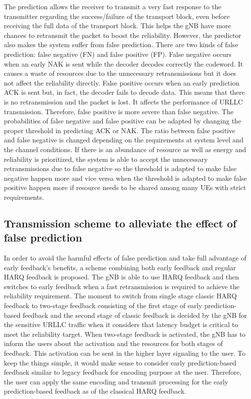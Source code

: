 \documentclass[conference]{IEEEtran}
\begin{document}
The prediction allows the receiver to transmit a very fast response to the transmitter regarding the success/failure of the transport block, even before receiving the full data of the transport block. This helps the gNB have more chances to retransmit the packet to boost the reliability. However, the predictor also makes the system suffer from false prediction. There are two kinds of false prediction: false negative (FN) and false positive (FP). False negative occurs when an early NAK is sent while the decoder decodes correctly the codeword. It causes a waste of resources due to the unnecessary retransmissions but it does not affect the reliability directly. False positive occurs when an early prediction ACK is sent but, in fact, the decoder fails to decode data. This means that there is no retransmission and the packet is lost. It affects the performance of URLLC transmission. Therefore, false positive is more severe than false negative. The probabilities of false negative and false positive can be adapted by changing the proper threshold in predicting ACK or NAK. The ratio between false positive and false negative is changed depending on the requirements at system level and the channel conditions.  If there is an abundance of resource as well as energy and reliability is prioritized, the system is able to accept the unnecessary retransmissions due to false negative so the threshold is adapted to make false negative happen more and vice versa when the threshold is adapted to make false positive happen more if resource needs to be shared among many UEs with strict requirements.

\subsection{Transmission scheme to alleviate the effect of false prediction}\label{CC}

In order to avoid the harmful effects of false prediction and take full advantage of early feedback's benefits, a scheme combining both early feedback and regular HARQ feedback is proposed. The gNB is able to use HARQ feedback and then switches to early feedback when a fast retransmission is required to achieve the reliability requirement. The moment to switch from single stage classic HARQ feedback to two-stage feedback consisting of the first stage of early prediction-based feedback and the second stage of classic feedback is decided by the gNB for the sensitive URLLC traffic when it considers that latency budget is critical to meet the reliability target. When two-stage feedback is activated, the gNB has to inform the users about the activation and the resources for both stages of feedback. This activation can be sent in the higher layer signaling to the user. To keep the things simple, it would make sense to consider early prediction-based feedback similar to legacy feedback for encoding purpose at the user. Therefore, the user can apply the same encoding and transmit processing for the early prediction-based feedback as of the classical HARQ feedback.
\end{document}
